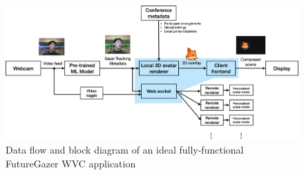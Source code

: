 \begin{figure}
	\centering
 	\includegraphics[width=\textwidth]{dataflow.pdf}
	\caption{Data flow and block diagram of an ideal fully-functional FutureGazer WVC application}
	\label{fig:dataflow}
\end{figure}



